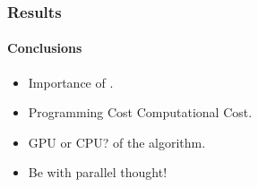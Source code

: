 \frame
{
\frametitle{Results}
\framesubtitle{Conclusions}

\begin{itemize}
    \item<1-> Importance of .
    \item<2-> Programming Cost  Computational Cost.
    \item<3-> GPU or CPU?  of the algorithm.
    \item<4-> Be  with parallel thought!
\end{itemize}

}
